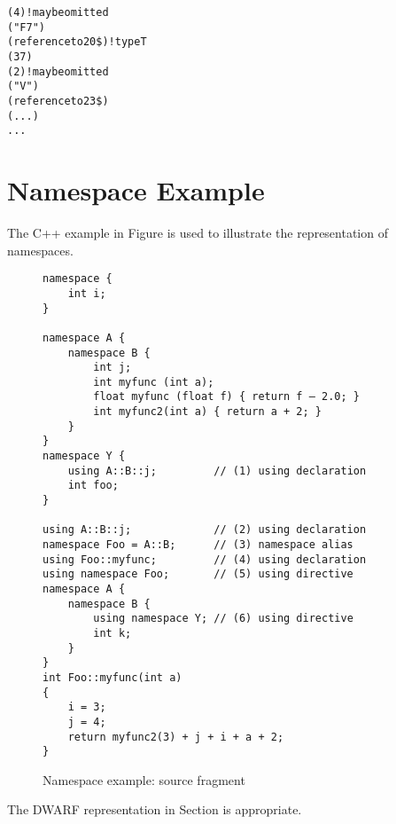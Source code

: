 \begin{alltt}
            (4) ! may be omitted
            ("F7")
            (reference to 20\$) ! type T
            (37)
            (2) ! may be omitted
        ("V")
        (reference to 23\$)
        (...)
        ...
\end{alltt}

\section{Namespace Example}
\label{app:namespaceexample}


The C++ example in 
Figure 
is used to illustrate the representation of namespaces.

\begin{figure}[here]
\begin{lstlisting}
namespace {
    int i;
}

namespace A {
    namespace B {
        int j;
        int myfunc (int a);
        float myfunc (float f) { return f – 2.0; }
        int myfunc2(int a) { return a + 2; }
    }
}
namespace Y {
    using A::B::j;         // (1) using declaration
    int foo;
}

using A::B::j;             // (2) using declaration
namespace Foo = A::B;      // (3) namespace alias
using Foo::myfunc;         // (4) using declaration
using namespace Foo;       // (5) using directive
namespace A {
    namespace B {
        using namespace Y; // (6) using directive
        int k;
    }
}
int Foo::myfunc(int a)
{
    i = 3;
    j = 4;
    return myfunc2(3) + j + i + a + 2;
}
\end{lstlisting}
\caption{Namespace example: source fragment} \label{fig:namespaceexamplesourcefragment}
\end{figure}


The DWARF representation in 
Section 
is appropriate.

